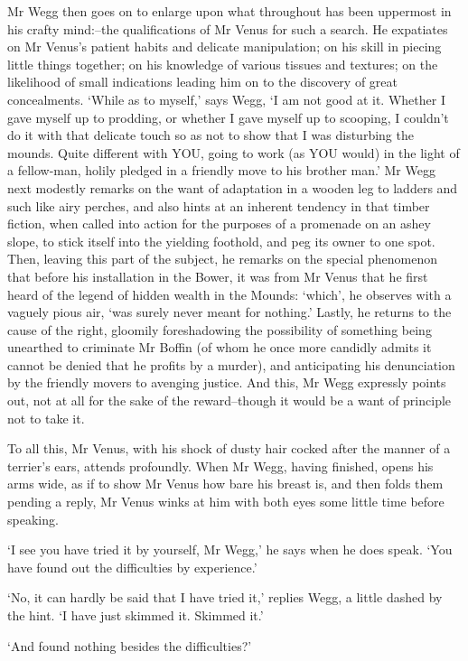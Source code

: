 Mr Wegg then goes on to enlarge upon what throughout has been uppermost
in his crafty mind:--the qualifications of Mr Venus for such a search.
He expatiates on Mr Venus’s patient habits and delicate manipulation; on
his skill in piecing little things together; on his knowledge of various
tissues and textures; on the likelihood of small indications leading him
on to the discovery of great concealments. ‘While as to myself,’ says
Wegg, ‘I am not good at it. Whether I gave myself up to prodding,
or whether I gave myself up to scooping, I couldn’t do it with that
delicate touch so as not to show that I was disturbing the mounds.
Quite different with YOU, going to work (as YOU would) in the light of
a fellow-man, holily pledged in a friendly move to his brother man.’ Mr
Wegg next modestly remarks on the want of adaptation in a wooden leg
to ladders and such like airy perches, and also hints at an inherent
tendency in that timber fiction, when called into action for the
purposes of a promenade on an ashey slope, to stick itself into the
yielding foothold, and peg its owner to one spot. Then, leaving this
part of the subject, he remarks on the special phenomenon that before
his installation in the Bower, it was from Mr Venus that he first heard
of the legend of hidden wealth in the Mounds: ‘which’, he observes with
a vaguely pious air, ‘was surely never meant for nothing.’ Lastly,
he returns to the cause of the right, gloomily foreshadowing the
possibility of something being unearthed to criminate Mr Boffin (of whom
he once more candidly admits it cannot be denied that he profits by a
murder), and anticipating his denunciation by the friendly movers to
avenging justice. And this, Mr Wegg expressly points out, not at all for
the sake of the reward--though it would be a want of principle not to
take it.

To all this, Mr Venus, with his shock of dusty hair cocked after the
manner of a terrier’s ears, attends profoundly. When Mr Wegg, having
finished, opens his arms wide, as if to show Mr Venus how bare his
breast is, and then folds them pending a reply, Mr Venus winks at him
with both eyes some little time before speaking.

‘I see you have tried it by yourself, Mr Wegg,’ he says when he does
speak. ‘You have found out the difficulties by experience.’

‘No, it can hardly be said that I have tried it,’ replies Wegg, a little
dashed by the hint. ‘I have just skimmed it. Skimmed it.’

‘And found nothing besides the difficulties?’

